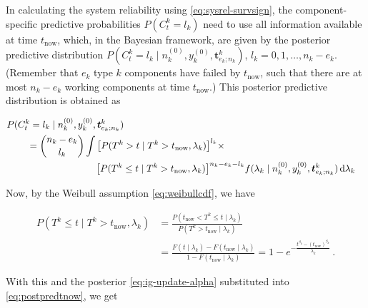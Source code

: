 \documentclass[Journal,SectionNumbers,SingleSpace,InsideFigs]{ascelike}
\newcommand{\dd}{\,\mathrm{d}}
\renewcommand{\vec}[1]{{\bm#1}}
\newcommand{\uz}{^{(0)}} %
\def\ykz{y\uz_k}
\def\nkz{n\uz_k}
\def\tnow{t_\text{now}}
\begin{document}
In calculating the system reliability using \eqref{eq:sysrel-survsign},
the component-specific predictive probabilities $P(C^k_t = l_k)$
need to use all information available at time $\tnow$,
which, in the Bayesian framework,
are given by the posterior predictive distribution 
$P(C^k_t = l_k\mid\nkz,\ykz, \vec{t}^k_{e_k;n_k})$, $l_k = 0, 1, \ldots, n_k-e_k$. %
(Remember that $e_k$ type $k$ components have failed by $\tnow$,
such that there are at most $n_k-e_k$ working components at time $\tnow$.)
This posterior predictive distribution is obtained as
\begin{linenomath*}
\begin{align}
\lefteqn{%
P(C^k_t = l_k\mid\nkz,\ykz, \vec{t}^k_{e_k;n_k})}\hspace*{5ex} \nonumber\\  %
 &= { n_k - e_k \choose l_k} \int \big[P(T^k >    t \mid T^k > \tnow, \lambda_k)\big]^{l_k} \times \nonumber\\ & \hspace*{17ex}
                                  \big[P(T^k \leq t \mid T^k > \tnow, \lambda_k)\big]^{n_k - e_k - l_k}
    f(\lambda_k\mid\nkz,\ykz,\vec{t}^k_{e_k;n_k}) \dd \lambda_k
\label{eq:postpredtnow}
\end{align}
\end{linenomath*}
%
Now, by the Weibull assumption \eqref{eq:weibullcdf}, we have
\begin{linenomath*}
\begin{align}
P(T^k \leq t \mid T^k > \tnow, \lambda_k)
 &= \frac{P(\tnow < T^k \leq t \mid\lambda_k)}{P(T^k > \tnow \mid \lambda_k)} \nonumber\\
 &= \frac{F(t\mid\lambda_k) - F(\tnow\mid\lambda_k)}{1-F(\tnow\mid\lambda_k)} 
  = 1 - e^{-\frac{t^{\beta_k} - (\tnow)^{\beta_k}}{\lambda_k}}\,.
\end{align}
\end{linenomath*}
%
With this and the posterior \eqref{eq:ig-update-alpha} substituted into \eqref{eq:postpredtnow}, we get
\end{document}
